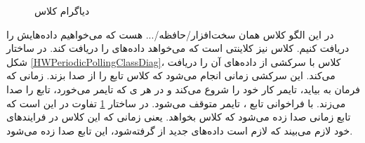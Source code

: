 \begin{figure}[h!]
\centering
{}
\caption{دیاگرام کلاس }
\label{HWOpportunisticPollingClassDiag}
\end{figure}
\begin{RTL}
در این الگو کلاس  همان سخت‌افزار/حافظه/... هست که
می‌خواهیم داده‌هایش را دریافت کنیم. کلاس  نیز
کلاینتی است که می‌خواهد داده‌های  را دریافت کند.
در ساختار شکل \ref{HWPeriodicPollingClassDiag}، کلاس
 با سرکشی از  داده‌های
آن را دریافت می‌کند. این سرکشی زمانی انجام می‌شود که کلاس 
تابع  را از  صدا بزند.
زمانی که فرمان  به بیاید، تایمر کار خود را شروع
می‌کند و در هر ی که تایمر می‌خورد، تابع  را
صدا می‌زند. با فراخوانی تابع ، تایمر متوقف می‌شود.
در ساختار \ref{HWOpportunisticPollingClassDiag} تفاوت
در این است که تابع  زمانی صدا زده می‌شود که کلاس
 بخواهد. یعنی زمانی که این
کلاس در فرایندهای خود لازم می‌بیند که لازم است داده‌های جدید از 
گرفته‌شود، این تابع صدا زده می‌شود.
\end{RTL}